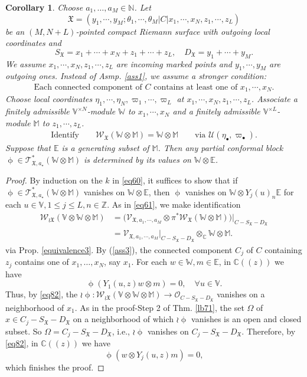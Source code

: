 \documentclass[11pt,b5paper,notitlepage]{article}
\theoremstyle{definition}
\theoremstyle{plain}
\newtheorem{co}[df]{Corollary}
\newcommand{\fk}{\mathfrak}
\newcommand{\mc}{\mathcal}
\newcommand{\SV}{\mathscr{V}}
\newcommand{\scr}{\mathscr}
\newcommand{\SX}{{S_{\fk X}}}
\newcommand{\DX}{D_{\fk X}}
\newcommand{\blt}{\bullet}
\newcommand{\Vbb}{\mathbb V}
\newcommand{\Wbb}{\mathbb W}
\newcommand{\Mbb}{\mathbb M}
\newcommand{\Cbb}{\mathbb C}
\newcommand{\Nbb}{\mathbb N}
\newcommand{\Zbb}{\mathbb Z}
\newcommand{\Ebb}{\mathbb E}
\newcommand{\<}{\left\langle}
\renewcommand{\>}{\right\rangle}
\newcommand{\MU}{\mathcal{U}}
\newcommand{\fx}{\mathfrak{X}}
\newcommand{\SW}{\mathscr{W}}
\numberwithin{equation}{section}
\begin{document}
\begin{co}\label{propagation3}
Choose $a_1,\dots,a_M\in\Nbb$. Let
$$
\fx=(y_1,\cdots,y_M;\theta_1,\cdots,\theta_M\big|C\big| x_1,\cdots,x_N,z_1,\cdots,z_L)
$$
be an $(M,N+L)$-pointed compact Riemann surface with outgoing local coordinates and 
$$
S_\fx=x_1+\cdots+x_N+z_1+\cdots+z_L,\quad D_\fx=y_1+\cdots+y_M.
$$
We assume $x_1,\cdots,x_N,z_1,\cdots,z_L$ are incoming marked points and $y_1,\cdots,y_M$ are outgoing ones. Instead of Asmp. \ref{ass1}, we assume a stronger condition:
\begin{align}\label{ass3}
\text{Each connected component of $C$ contains at least one of $x_1,\cdots,x_N$.}
\end{align}
Choose local coordinates $\eta_1,\cdots,\eta_N,\varpi_1,\cdots,\varpi_L$ at $x_1,\cdots,x_N,z_1,\cdots,z_L$. Associate a finitely admissible $\Vbb^{\times N}$-module $\Wbb$ to $x_1,\cdots,x_N$ and a finitely admissible $\Vbb^{\times L}$-module $\Mbb$ to $z_1,\cdots,z_L$. 
\begin{align*}
\text{Identify}\qquad\SW_\fx(\Wbb\otimes \Mbb)=\Wbb\otimes \Mbb\qquad \text{via }\MU(\eta_\blt,\varpi_\blt).
\end{align*}
Suppose that $\Ebb$ is a generating subset of $\Mbb$. Then any partial conformal block $\upphi\in\scr T_{\fk X,a_\star}^*(\Wbb\otimes\Mbb)$ is determined by its values on $\Wbb\otimes \Ebb$.
\end{co}


\begin{proof}
By induction on the $k$ in \eqref{eq60}, it suffices to show that    if $\upphi\in\scr T_{\fk X,a_\star}^*(\Wbb\otimes\Mbb)$ vanishes on $\Wbb\otimes \Ebb$, then $\upphi$ vanishes on $\Wbb\otimes Y_j(u)_n \Ebb$ for each $u\in \Vbb, 1\leq j\leq L,n\in \Zbb$.  As in \eqref{eq61}, we make identification
$$
\begin{aligned}
 \SW_{\wr\fx}(\Vbb\otimes \Wbb\otimes \Mbb)&=\big(\SV_{\fx,a_1,\cdots,a_M}\otimes \pi^*\SW_\fx(\Wbb\otimes \Mbb)\big)\vert_{C-S_\fx-D_\fx}\\
 &=\SV_{\fx,a_1,\cdots,a_M}\vert_{C-S_\fx-D_\fx}\otimes_\Cbb \Wbb\otimes \Mbb.
 \end{aligned}
$$
via Prop. \ref{equivalence3}. By (\ref{ass3}),  the connected component $C_j$ of $C$ containing $z_j$ contains one of $x_1,\dots,x_N$, say $x_1$. For each $w\in \Wbb,m\in \Ebb$, in $\Cbb((z))$ we have
$$
\upphi(Y_1(u,z)w\otimes m)=0,\quad \forall u\in \Vbb.
$$
Thus, by \eqref{eq82}, the $\wr\upphi:\scr W_{\wr\fk X}(\Vbb\otimes\Wbb\otimes\Mbb)\rightarrow\mc O_{C-\SX-\DX}$ vanishes on a neighborhood of $x_1$. As in the proof-Step 2 of Thm. \ref{lb71}, the set $\Omega$ of $x\in C_j-\SX-\DX$ on a neighborhood of which $\wr\upphi$ vanishes is an open and closed subset. So $\Omega=C_j-\SX-\DX$, i.e., $\wr\upphi$ vanishes on $C_j-\SX-\DX$. Therefore, by \eqref{eq82}, in $\Cbb((z))$ we have
$$
\upphi(w\otimes Y_j(u,z)m)=0,
$$
which finishes the proof.
\end{proof}
\end{document}
